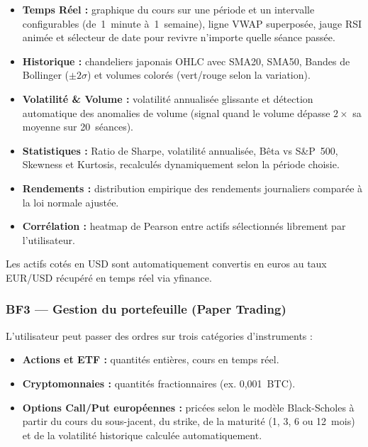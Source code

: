 \documentclass[a4paper, 12pt, twoside]{article}
\begin{document}
    \begin{itemize}
        \item \textbf{Temps Réel :} graphique du cours sur une période et un
              intervalle configurables (de~1~minute à~1~semaine), ligne VWAP
              superposée, jauge RSI animée et sélecteur de date pour
              revivre n'importe quelle séance passée.
        \item \textbf{Historique :} chandeliers japonais OHLC avec SMA20,
              SMA50, Bandes de Bollinger ($\pm 2\sigma$) et volumes colorés
              (vert/rouge selon la variation).
        \item \textbf{Volatilité \& Volume :} volatilité annualisée glissante
              et détection automatique des anomalies de volume
              (signal quand le volume dépasse $2\times$ sa moyenne sur
              20~séances).
        \item \textbf{Statistiques :} Ratio de Sharpe, volatilité annualisée,
              Bêta vs S\&P~500, Skewness et Kurtosis, recalculés
              dynamiquement selon la période choisie.
        \item \textbf{Rendements :} distribution empirique des rendements
              journaliers comparée à la loi normale ajustée.
        \item \textbf{Corrélation :} heatmap de Pearson entre actifs
              sélectionnés librement par l'utilisateur.
    \end{itemize}

    Les actifs cotés en USD sont automatiquement convertis en euros au taux
    EUR/USD récupéré en temps réel via yfinance.

    \subsubsection*{BF3 --- Gestion du portefeuille (Paper Trading)}

    L'utilisateur peut passer des ordres sur trois catégories d'instruments :
    \begin{itemize}
        \item \textbf{Actions et ETF :} quantités entières, cours en temps
              réel.
        \item \textbf{Cryptomonnaies :} quantités fractionnaires (ex.
              0,001~BTC).
        \item \textbf{Options Call/Put européennes :} pricées selon le modèle
              Black-Scholes à partir du cours du sous-jacent, du strike,
              de la maturité (1, 3, 6 ou 12~mois) et de la volatilité
              historique calculée automatiquement.
    \end{itemize}
\end{document}
